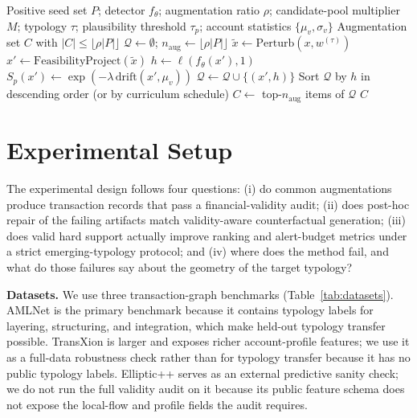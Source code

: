 \documentclass[sigconf,review,anonymous]{acmart}
\newcommand{\fcca}{\textsc{FC-CGA}\xspace}
\begin{document}
\begin{algorithm}[t]
\caption{\fcca CounterfactualGenerate}
\label{alg:generate}
\begin{algorithmic}[1]
\Require Positive seed set $P$; detector $f_\theta$; augmentation ratio
         $\rho$; candidate-pool multiplier $M$; typology $\tau$;
         plausibility threshold $\tau_p$; account statistics
         $\{\mu_v,\sigma_v\}$
\Ensure  Augmentation set $C$ with $|C|\!\leq\!\lfloor \rho |P|\rfloor$
\State $\mathcal{Q}\leftarrow\emptyset$; \;
       $n_{\text{aug}}\leftarrow\lfloor \rho |P|\rfloor$
    \State $\tilde{x}\leftarrow \mathrm{Perturb}(x, w^{(\tau)})$
    \State $x'\leftarrow \mathrm{FeasibilityProject}(\tilde{x})$
    \State $h\leftarrow \ell(f_\theta(x'), 1)$
    \State $S_p(x')\leftarrow \exp(-\lambda\,\mathrm{drift}(x',\mu_v))$
        \State $\mathcal{Q}\leftarrow \mathcal{Q}\cup\{(x', h)\}$
    \EndIf
\EndFor
\State Sort $\mathcal{Q}$ by $h$ in descending order (or by curriculum schedule)
\State $C \leftarrow$ top-$n_{\text{aug}}$ items of $\mathcal{Q}$
\State \Return $C$
\end{algorithmic}
\end{algorithm}

\section{Experimental Setup}
\label{sec:setup}

The experimental design follows four questions: (i) do common augmentations
produce transaction records that pass a financial-validity audit; (ii) does
post-hoc repair of the failing artifacts match validity-aware counterfactual
generation; (iii) does valid hard support actually improve ranking and
alert-budget metrics under a strict emerging-typology protocol; and (iv) where
does the method fail, and what do those failures say about the geometry of the
target typology?

\textbf{Datasets.}
We use three transaction-graph benchmarks (Table~\ref{tab:datasets}). AMLNet
is the primary benchmark because it contains typology labels for layering,
structuring, and integration, which make held-out typology transfer possible.
TransXion is larger and exposes richer account-profile features; we use it as a
full-data robustness check rather than for typology transfer because it has no
public typology labels. Elliptic++ serves as an external predictive sanity
check; we do not run the full validity audit on it because its public feature
schema does not expose the local-flow and profile fields the audit requires.
\end{document}
